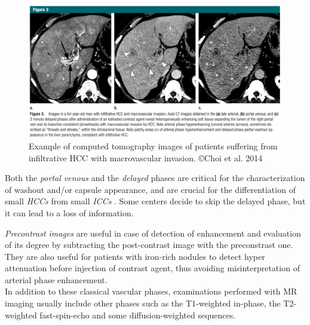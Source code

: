 \documentclass[]{article}
\begin{document}
\begin{figure}[th!]
\centering
\includegraphics[width=0.7\linewidth]{images/image15}
\caption{Example of computed tomography images of patients suffering from infiltrative HCC with macrovascular invasion. ©Choi et al. 2014 \cite{Choi2014a}}
\label{Choi2014a_Fig3}
\end{figure}

Both the \emph{portal venous} and the \emph{delayed} phases are critical
for the characterization of washout and/or capsule appearance, and are
crucial for the differentiation of small \emph{HCCs} from small
\emph{ICCs} \cite{Iannaccone2005,Rimola2009}. Some centers decide
to skip the delayed phase, but it can lead to a loss of information.

\emph{Precontrast images} are useful in case of detection of enhancement
and evaluation of its degree by subtracting the post-contrast image with
the preconstrast one. They are also useful for patients with iron-rich
nodules to detect hyper attenuation before injection of contrast agent,
thus avoiding misinterpretation of arterial phase enhancement.\\
In addition to these classical vascular phases, examinations performed
with MR imaging usually include other phases such as the T1-weighted
in-phase, the T2-weighted fast-spin-echo and some diffusion-weighted
sequences.\\
\end{document}
